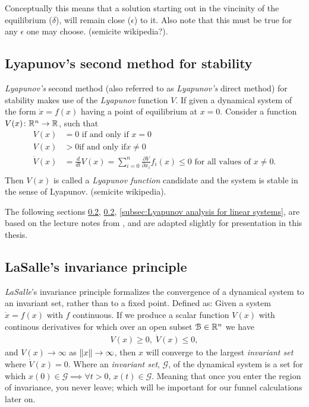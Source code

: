 Conceptually this means that a solution starting out in the vincinity of the
equilibrium (\(\delta\)), will remain close (\(\epsilon\)) to it. Also note that
this must be true for any \(\epsilon\) one may choose. (semicite wikipedia?).

\subsection{Lyapunov's second method for stability}

\textit{Lyapunov's} second method (also referred to as \textit{Lyapunov's}
direct method) for stability makes use of the \textit{Lyapunov} function \(V\).
If given a dynamical system of the form \(\dot{x} = f(x)\) having a point of
equilibrium at \(x = 0\). Consider a function \(V(x) \colon \mathbb{R}^n \rightarrow
\mathbb{R}\), such that
\begin{align*}
  V(x) &= 0 \text{ if and only if } x = 0 \\
  V(x) &> 0 \text{if and only if} x \neq 0 \\
  \dot{V}(x) &= \frac{d}{dt}V(x) = \sum_{i=0}^{n} \frac{\partial V}{\partial x_i} f_i(x) \leq 0 \text{ for all values of } x \neq 0. \\
\end{align*}
Then \(V(x)\) is called a \textit{Lyapunov function} candidate and the system is
stable in the sense of Lyapunov. (semicite wikipedia).

The following sections \ref{subsec:LaSalle's invariance principle},
\ref{subsec:LaSalle's invariance principle}, \ref{subsec:Lyapunov analysis for
  linear systems}, are based on the lecture notes from
\cite{tedrakeUnderactuatedRoboticsAlgorithms2019}, and are adapted slightly for
presentation in this thesis.

\subsection{LaSalle's invariance principle}
\label{subsec:LaSalle's invariance principle}

\textit{LaSalle}'s invariance principle formalizes the convergence of a
dynamical system to an invariant set, rather than to a fixed point. Defined as:
Given a system \(\dot{x} = f(x)\) with \(f\) continuous. If we produce a scalar
function \(V(x)\) with continous derivatives for which over an open subset
\(\mathcal{B} \in \mathbb{R}^n\) we have
\begin{align*}
  V(x) \geq 0, \; \dot{V}(x) \leq 0,
\end{align*}
and \(V(x) \rightarrow \infty\) as \(\lVert x\rVert \rightarrow \infty\), then \(x\)
will converge to the largest \textit{invariant set} where \(\dot{V}(x) = 0\).
Where an \textit{invariant set}, \(\mathcal{G}\), of the dynamical system is a
set for which \(x(0) \in \mathcal{G} \implies \forall t > 0,\, x(t) \in
\mathcal{G}\). Meaning that once you enter the region of invariance, you never
leave; which will be important for our funnel calculations later on.

